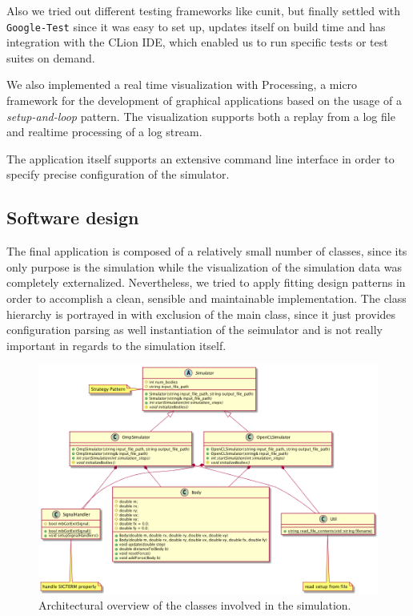 \documentclass[a4paper,11pt]{scrartcl} %
\begin{document}
Also we tried out different testing frameworks like cunit, but finally settled with \texttt{Google-Test} since it was easy to set up, updates itself on build time and has integration with the CLion IDE, which enabled us to run specific tests or test suites on demand.

We also implemented a real time visualization with Processing, a micro framework for the development of graphical applications based on the usage of a \textit{setup-and-loop} pattern. The visualization supports both a replay from a log file and realtime processing of a log stream.

The application itself supports an extensive command line interface in order to specify precise configuration of the simulator.

\subsection{Software design}

The final application is composed of a relatively small number of classes, since its only purpose is the simulation while the visualization of the simulation data was completely externalized. Nevertheless, we tried to apply fitting design patterns in order to accomplish a clean, sensible and maintainable implementation. The class hierarchy is portrayed in \cite{fig:classes} with exclusion of the main class, since it just provides configuration parsing as well instantiation of the seimulator and is not really important in regards to the simulation itself.

\begin{figure}[h!]
	\centering
	\includegraphics[width=\textwidth]{img/classes.png}
	\caption{Architectural overview of the classes involved in the simulation.}
	\label{fig:classes}
\end{figure}
\end{document}
